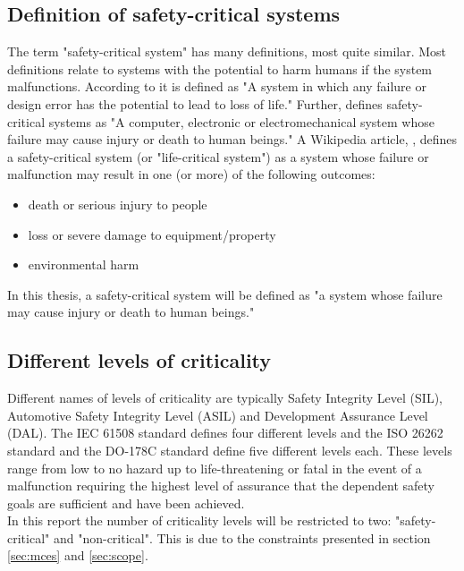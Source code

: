 \subsection{Definition of safety-critical systems}
The term "safety-critical system" has many definitions, most quite similar. Most definitions relate to systems with the potential to harm humans if the system malfunctions. According to \cite{website:encyclopedia} it is defined as "A system in which any failure or design error has the potential to lead to loss of life." Further, \cite{website:dictionary} defines safety-critical systems as "A computer, electronic or electromechanical system whose failure may cause injury or death to human beings." A Wikipedia article, \cite{website:wikipedia}, defines a safety-critical system (or "life-critical system") as a system whose failure or malfunction may result in one (or more) of the following outcomes:
\begin{itemize}
\item death or serious injury to people
\item loss or severe damage to equipment/property
\item environmental harm
\end{itemize}
In this thesis, a safety-critical system will be defined as "a system whose failure may cause injury or death to human beings."

\subsection{Different levels of criticality}
Different names of levels of criticality are typically Safety Integrity Level (SIL), Automotive Safety Integrity Level (ASIL) and Development Assurance Level (DAL). The IEC 61508 standard \cite{IEC61508} defines four different levels and the ISO 26262 standard \cite{ISO26262} and the DO-178C standard \cite{DO178C} define five different levels each. These levels range from low to no hazard up to life-threatening or fatal in the event of a malfunction requiring the highest level of assurance that the dependent safety goals are sufficient and have been achieved.\\

In this report the number of criticality levels will be restricted to two: "safety-critical" and "non-critical". This is due to the constraints presented in section \ref{sec:mces} and \ref{sec:scope}.


